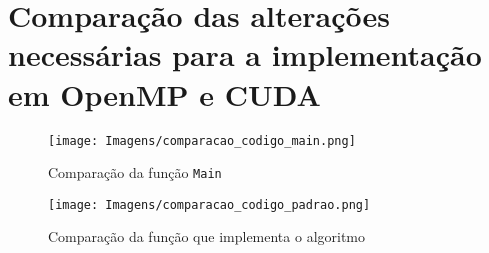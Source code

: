 \section{Comparação das alterações necessárias para a implementação em OpenMP e CUDA}

\begin{figure}[H]
\centering
\texttt{[image: Imagens/comparacao\_codigo\_main.png]}
\caption{Comparação da função \texttt{Main}}
\label{fig:comparacao_codigo_main}
\end{figure}

\begin{figure}[H]
\centering
\texttt{[image: Imagens/comparacao\_codigo\_padrao.png]}
\caption{Comparação da função que implementa o algoritmo}
\label{fig:comparacao_codigo_padrao}
\end{figure}
